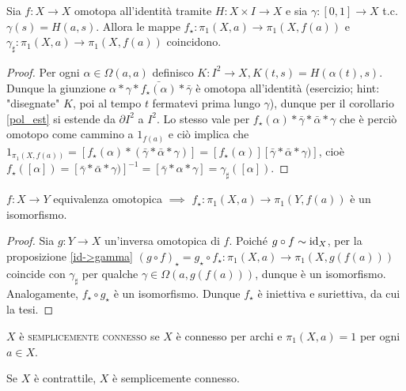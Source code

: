 \begin{prop} \label{id->gamma}
  Sia $f:X \rightarrow X$ omotopa all'identità tramite $H: X \times I \rightarrow X$ e sia $\gamma: [0, 1] \rightarrow X$ t.c. $\gamma(s)=H(a, s)$. Allora le mappe $f_{\star}: \pi_1(X, a) \rightarrow \pi_1(X, f(a))$ e $\gamma_{\sharp}: \pi_1(X, a) \rightarrow \pi_1(X, f(a))$ coincidono.
\end{prop}

\begin{proof}
  Per ogni $\alpha \in \Omega(a, a)$ definisco $K: I^2 \rightarrow X, K(t, s)=H(\alpha(t), s)$. Dunque la giunzione $\alpha * \gamma * \bar{f_{\star}(\alpha)} * \bar{\gamma}$ è omotopa all'identità (esercizio; hint: "disegnate" $K$, poi al tempo $t$ fermatevi prima lungo $\gamma$), dunque per il corollario \ref{pol_est} si estende da $\partial I^2$ a $I^2$. Lo stesso vale per
  $f_{\star}(\alpha) * \bar{\gamma} * \bar{\alpha} * \gamma$ che è perciò omotopo come cammino a $1_{f(a)}$ e ciò implica che
  $1_{\pi_1(X, f(a))}=[f_{\star}(\alpha) * (\bar{\gamma} * \bar{\alpha} * \gamma)]=[f_{\star}(\alpha)][\bar{\gamma} * \bar{\alpha} * \gamma)]$, cioè
  $f_{\star}([\alpha])=[\bar{\gamma} * \bar{\alpha} * \gamma)]^{-1}=[\bar{\gamma} * \alpha * \gamma]=\gamma_{\sharp}([\alpha])$.
\end{proof}

\begin{thm} \label{eq_omo->iso}
  $f: X \rightarrow Y$ equivalenza omotopica $\implies$ $f_{\star}: \pi_1(X, a) \rightarrow \pi_1(Y, f(a))$ è un isomorfismo.
\end{thm}

\begin{proof}
  Sia $g: Y \rightarrow X$ un'inversa omotopica di $f$. Poiché $g \circ f \sim \operatorname{id}_X$, per la proposizione \ref{id->gamma} $(g \circ f)_{\star}=g_{\star} \circ f_{\star}: \pi_1(X, a) \rightarrow \pi_1(X, g(f(a)))$ coincide con $\gamma_{\sharp}$ per qualche $\gamma \in \Omega(a, g(f(a)))$, dunque è un isomorfismo.
  Analogamente, $f_{\star} \circ g_{\star}$ è un isomorfismo. Dunque $f_{\star}$ è iniettiva e suriettiva, da cui la tesi.
\end{proof}

\begin{defn}
  $X$ è \textsc{semplicemente connesso} se $X$ è connesso per archi e $\pi_1(X, a)={1}$ per ogni $a \in X$.
\end{defn}

\begin{cor}
  Se $X$ è contrattile, $X$ è semplicemente connesso.
\end{cor}

